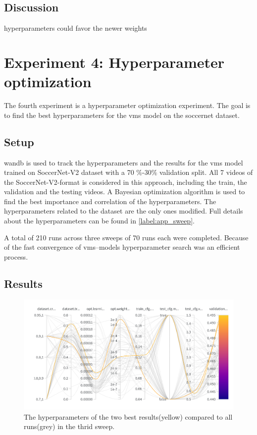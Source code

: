 
\subsection{Discussion}
\label{ssec:ex3_discussion}
hyperparameters could favor the newer weights


\section{Experiment 4: Hyperparameter optimization}
\label{sec:experiment4}

The fourth experiment is a hyperparameter optimization experiment.
The goal is to find the best hyperparameters for the \acrshort{vms} model on the soccernet dataset.

\subsection{Setup}
\label{ssec:ex4_setup}

\acrlong{wandb} is used to track the hyperparameters and the results for the \acrshort{vms} model trained on SoccerNet-V2 dataset with a 70 \(\%\)-30\(\%\) validation split. All 7 videos of the SoccerNet-V2-format is considered in this approach, including the train, the validation and the testing videos. A Bayesian optimization algorithm is used to find the best importance and correlation of the hyperparameters. The hyperparameters related to the dataset are the only ones modified. Full details about the hyperparameters can be found in \autoref{label:app_sweep}.

A total of 210 runs across three sweeps of 70 runs each were completed. Because of the fast convergence of \acrshort{vms}--models hyperparameter search was an efficient process. 


\subsection{Results}
\label{ssec:ex4_results}

\begin{figure}
    \centering
    \includegraphics[width=1\linewidth]{figures/sweep_two_best.png}
    \caption{The hyperparameters of the two best results(yellow) compared to all runs(grey) in the thrid sweep. }
    \label{fig:sweep_best_two}
\end{figure}


